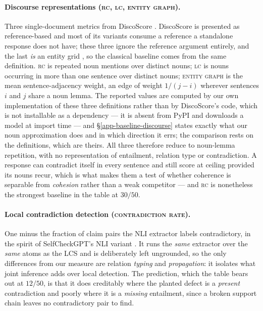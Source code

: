 \paragraph{Discourse representations (\textsc{rc}, \textsc{lc}, \textsc{entity graph}).} Three
single-document metrics from DiscoScore \citep{discoscore}. DiscoScore is presented as
reference-based and most of its variants consume a reference a standalone response does not have;
these three ignore the reference argument entirely, and the last \emph{is} an entity grid
\citep{barzilay}, so the classical baseline comes from the same definition. \textsc{rc} is
repeated noun mentions over distinct nouns; \textsc{lc} is nouns occurring in more than one sentence
over distinct nouns; \textsc{entity graph} is the mean sentence-adjacency weight, an edge of weight
$1/(j-i)$ wherever sentences $i$ and $j$ share a noun lemma. The reported values are computed by our
own implementation of these three definitions rather than by DiscoScore's code, which is not
installable as a dependency --- it is absent from PyPI and downloads a model at import time --- and
\S\ref{app-baseline-discourse} states exactly what our noun approximation does and in which direction
it errs; the comparison rests on the definitions, which are theirs. All three therefore reduce to
noun-lemma repetition, with no representation of entailment, relation type or contradiction. A
response can contradict itself in every sentence and still score at ceiling provided its nouns
recur, which is what makes them a test of whether coherence is separable from \emph{cohesion} rather
than a weak competitor --- and \textsc{rc} is nonetheless the strongest baseline in the table at
$30/50$.

\paragraph{Local contradiction detection (\textsc{contradiction rate}).} One minus the fraction of
claim pairs the NLI extractor labels contradictory, in the spirit of SelfCheckGPT's NLI variant
\citep{selfcheckgpt}. It runs the \emph{same} extractor over the \emph{same} atoms as the LCS and is
deliberately left ungrounded, so the only differences from our measure are relation \emph{typing} and
\emph{propagation}: it isolates what joint inference adds over local detection. The prediction, which
the table bears out at $12/50$, is that it does creditably where the planted defect is a
\emph{present} contradiction and poorly where it is a \emph{missing} entailment, since a broken
support chain leaves no contradictory pair to find.

